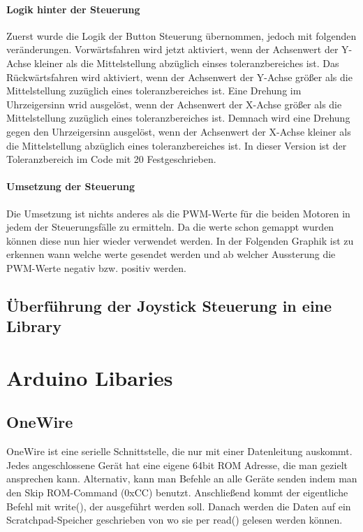 \documentclass[12pt]{article}
\begin{document}
\paragraph{Logik hinter der Steuerung}
Zuerst wurde die Logik der Button Steuerung übernommen, jedoch mit folgenden veränderungen. 
Vorwärtsfahren wird jetzt aktiviert, wenn der Achsenwert der Y-Achse kleiner als die Mittelstellung abzüglich einses toleranzbereiches ist.
Das Rückwärtsfahren wird aktiviert, wenn der Achsenwert der Y-Achse größer als die Mittelstellung zuzüglich eines toleranzbereiches ist.
Eine Drehung im Uhrzeigersinn wrid ausgelöst, wenn der Achsenwert der X-Achse größer als die Mittelstellung zuzüglich eines toleranzbereiches ist. Demnach wird eine Drehung gegen den Uhrzeigersinn ausgelöst, wenn der Achsenwert der X-Achse kleiner als die Mittelstellung abzüglich eines toleranzbereiches ist.
In dieser Version ist der Toleranzbereich im Code mit 20 Festgeschrieben.
\paragraph{Umsetzung der Steuerung}
Die Umsetzung ist nichts anderes als die PWM-Werte für die beiden Motoren in jedem der Steuerungsfälle zu ermitteln. Da die werte schon gemappt wurden können diese nun hier wieder verwendet werden. In der Folgenden Graphik ist zu erkennen wann welche werte gesendet werden und ab welcher Aussterung die PWM-Werte negativ bzw. positiv werden.

\subsection{Überführung der Joystick Steuerung in eine Library} %

\newpage
\section{Arduino Libaries} %
\subsection{OneWire}
OneWire ist eine serielle Schnittstelle, die nur mit einer Datenleitung auskommt. Jedes angeschlossene Gerät hat eine eigene 64bit ROM Adresse, die man gezielt ansprechen kann. Alternativ, kann man Befehle an alle Geräte senden indem man den Skip ROM-Command (0xCC) benutzt. Anschließend kommt der eigentliche Befehl mit write(), der ausgeführt werden soll. Danach werden die Daten auf ein Scratchpad-Speicher geschrieben von wo sie per read() gelesen werden können. 
\end{document}
